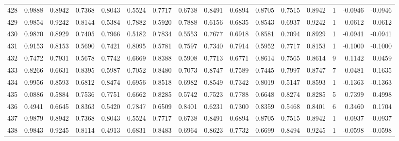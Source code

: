 \begin{tabular}{lrrrrrrrrrrrrrrr}
428 &      0.9888 &  0.8942 &  0.7368 &  0.8043 &  0.5524 &  0.7717 &  0.6738 &  0.8491 &  0.6894 &  0.8705 &   0.7515 &     0.8942 &      1 &                   -0.0946 &                    -0.0946 \\
429 &      0.9854 &  0.9242 &  0.8144 &  0.5384 &  0.7882 &  0.5920 &  0.7888 &  0.6156 &  0.6835 &  0.8543 &   0.6937 &     0.9242 &      1 &                   -0.0612 &                    -0.0612 \\
430 &      0.9870 &  0.8929 &  0.7405 &  0.7966 &  0.5182 &  0.7834 &  0.5553 &  0.7677 &  0.6918 &  0.8581 &   0.7094 &     0.8929 &      1 &                   -0.0941 &                    -0.0941 \\
431 &      0.9153 &  0.8153 &  0.5690 &  0.7421 &  0.8095 &  0.5781 &  0.7597 &  0.7340 &  0.7914 &  0.5952 &   0.7717 &     0.8153 &      1 &                   -0.1000 &                    -0.1000 \\
432 &      0.7472 &  0.7931 &  0.5678 &  0.7742 &  0.6669 &  0.8388 &  0.5908 &  0.7713 &  0.6771 &  0.8614 &   0.7565 &     0.8614 &      9 &                    0.1142 &                     0.0459 \\
433 &      0.8266 &  0.6631 &  0.8395 &  0.5987 &  0.7052 &  0.8480 &  0.7073 &  0.8747 &  0.7589 &  0.7445 &   0.7997 &     0.8747 &      7 &                    0.0481 &                    -0.1635 \\
434 &      0.9956 &  0.8593 &  0.6812 &  0.8474 &  0.6956 &  0.8518 &  0.6982 &  0.8549 &  0.7342 &  0.8019 &   0.5147 &     0.8593 &      1 &                   -0.1363 &                    -0.1363 \\
435 &      0.0886 &  0.5884 &  0.7536 &  0.7751 &  0.6662 &  0.8285 &  0.5742 &  0.7523 &  0.7788 &  0.6648 &   0.8274 &     0.8285 &      5 &                    0.7399 &                     0.4998 \\
436 &      0.4941 &  0.6645 &  0.8363 &  0.5420 &  0.7847 &  0.6509 &  0.8401 &  0.6231 &  0.7300 &  0.8359 &   0.5468 &     0.8401 &      6 &                    0.3460 &                     0.1704 \\
437 &      0.9879 &  0.8942 &  0.7368 &  0.8043 &  0.5524 &  0.7717 &  0.6738 &  0.8491 &  0.6894 &  0.8705 &   0.7515 &     0.8942 &      1 &                   -0.0937 &                    -0.0937 \\
438 &      0.9843 &  0.9245 &  0.8114 &  0.4913 &  0.6831 &  0.8483 &  0.6964 &  0.8623 &  0.7732 &  0.6699 &   0.8494 &     0.9245 &      1 &                   -0.0598 &                    -0.0598 \\

\end{tabular}
